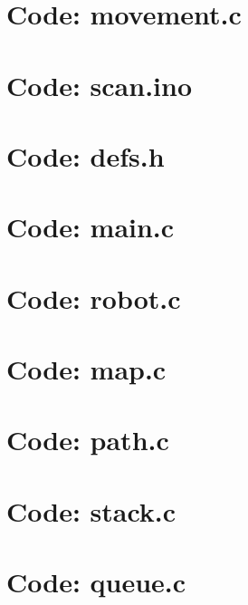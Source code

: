 \chapter{Code: movement.c}
\label{app:movement}


\chapter{Code: scan.ino}
\label{app:scan}


\chapter{Code: defs.h}
\label{app:defs.h}


\chapter{Code: main.c}
\label{app:main.c}


\chapter{Code: robot.c}
\label{app:robot.c}


\chapter{Code: map.c}
\label{app:map.c}


\chapter{Code: path.c}
\label{app:path.c}


\chapter{Code: stack.c}
\label{app:stack.c}


\chapter{Code: queue.c}
\label{app:queue.c}

